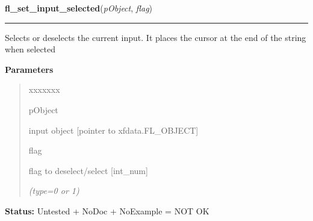 \hspace{.8\funcindent}\begin{boxedminipage}{\funcwidth}

    \raggedright \textbf{fl\_set\_input\_selected}(\textit{pObject}, \textit{flag})

    \vspace{-1.5ex}

    \rule{\textwidth}{0.5\fboxrule}
\setlength{\parskip}{2ex}
    Selects or deselects the current input. It places the cursor at the end
    of the string when selected

\setlength{\parskip}{1ex}
      \textbf{Parameters}
      \vspace{-1ex}

      \begin{quote}
        \begin{Ventry}{xxxxxxx}

          \item[pObject]

          input object [pointer to xfdata.FL\_OBJECT]

          \item[flag]

          flag to deselect/select [int\_num]

            {\it (type=0 or 1)}

        \end{Ventry}

      \end{quote}

\textbf{Status:} Untested + NoDoc + NoExample = NOT OK



    \end{boxedminipage}

    \label{xformslib:library:fl_set_input_selected_range}

    \vspace{0.5ex}


